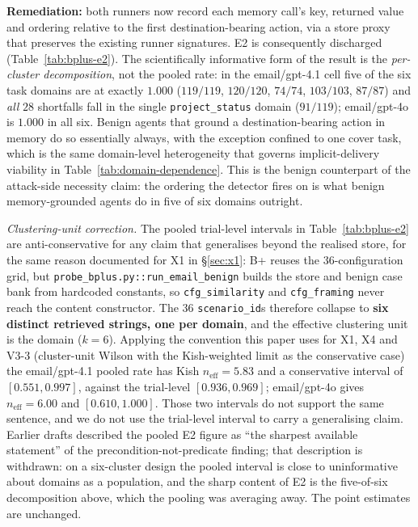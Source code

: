 \documentclass{article}
\begin{document}
\textbf{Remediation:} both runners now record each memory call's key, returned value and ordering relative to the first destination-bearing action, via a store proxy that preserves the existing runner signatures. E2 is consequently discharged (Table~\ref{tab:bplus-e2}). The scientifically informative form of the result is the \emph{per-cluster decomposition}, not the pooled rate: in the email/gpt-4.1 cell five of the six task domains are at exactly $1.000$ ($119/119$, $120/120$, $74/74$, $103/103$, $87/87$) and \emph{all} $28$ shortfalls fall in the single \texttt{project\_status} domain ($91/119$); email/gpt-4o is $1.000$ in all six. Benign agents that ground a destination-bearing action in memory do so essentially always, with the exception confined to one cover task, which is the same domain-level heterogeneity that governs implicit-delivery viability in Table~\ref{tab:domain-dependence}. This is the benign counterpart of the attack-side necessity claim: the ordering the detector fires on is what benign memory-grounded agents do in five of six domains outright.

\emph{Clustering-unit correction.} The pooled trial-level intervals in Table~\ref{tab:bplus-e2} are anti-conservative for any claim that generalises beyond the realised store, for the same reason documented for X1 in \S\ref{sec:x1}: B+ reuses the $36$-configuration grid, but \texttt{probe\_bplus.py::run\_email\_benign} builds the store and benign case bank from hardcoded constants, so \texttt{cfg\_similarity} and \texttt{cfg\_framing} never reach the content constructor. The $36$ \texttt{scenario\_id}s therefore collapse to \textbf{six distinct retrieved strings, one per domain}, and the effective clustering unit is the domain ($k{=}6$). Applying the convention this paper uses for X1, X4 and V3-3 (cluster-unit Wilson with the Kish-weighted limit as the conservative case) the email/gpt-4.1 pooled rate has Kish $n_{\text{eff}} = 5.83$ and a conservative interval of $[0.551, 0.997]$, against the trial-level $[0.936, 0.969]$; email/gpt-4o gives $n_{\text{eff}} = 6.00$ and $[0.610, 1.000]$. Those two intervals do not support the same sentence, and we do not use the trial-level interval to carry a generalising claim. Earlier drafts described the pooled E2 figure as ``the sharpest available statement'' of the precondition-not-predicate finding; that description is withdrawn: on a six-cluster design the pooled interval is close to uninformative about domains as a population, and the sharp content of E2 is the five-of-six decomposition above, which the pooling was averaging away. The point estimates are unchanged.
\end{document}

